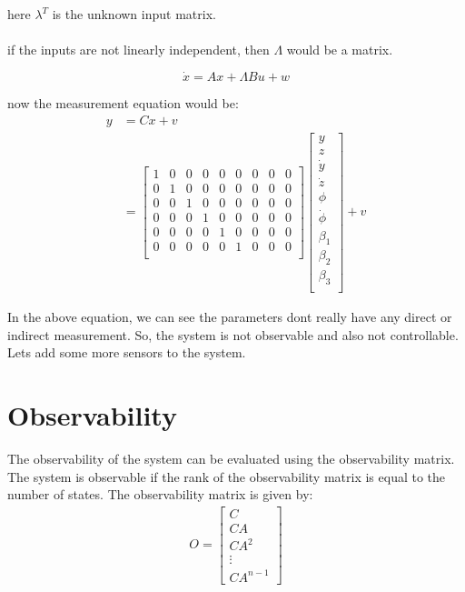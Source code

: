 \documentclass[12pt]{article}
\begin{document}
here $\lambda^T$ is the unknown input matrix. \\\\
if the inputs are not linearly independent, then $\Lambda$ would be a matrix.

$$\dot{x} = Ax + \Lambda B u + w$$

now the measurement equation would be:
\begin{align*}
    y &= Cx + v \\
    &= 
    \begin{bmatrix}
        1 & 0 & 0 & 0 & 0 & 0 & 0  & 0 & 0  \\
        0 & 1 & 0 & 0 & 0 & 0 & 0  & 0 & 0  \\
        0 & 0 & 1 & 0 & 0 & 0 & 0  & 0 & 0  \\
        0 & 0 & 0 & 1 & 0 & 0 & 0  & 0 & 0  \\
        0 & 0 & 0 & 0 & 1 & 0 & 0  & 0 & 0  \\
        0 & 0 & 0 & 0 & 0 & 1 & 0  & 0 & 0  \\
    \end{bmatrix}
    \begin{bmatrix}
        y \\
        z \\
        \dot{y} \\
        \dot{z} \\
        \phi \\
        \dot{\phi} \\
        \beta_1 \\
        \beta_2 \\
        \beta_3 \\
    \end{bmatrix} + v
\end{align*}

In the above equation, we can see the parameters dont really have any direct or indirect measurement. So, the system is not observable and also not controllable. Lets add some more sensors to the system. 

\section*{Observability}
The observability of the system can be evaluated using the observability matrix. The system is observable if the rank of the observability matrix is equal to the number of states. The observability matrix is given by:
\begin{align*}
    O = \begin{bmatrix}
        C \\
        CA \\
        CA^2 \\
        \vdots \\
        CA^{n-1}
    \end{bmatrix}
\end{align*}





\pagebreak


\end{document}
